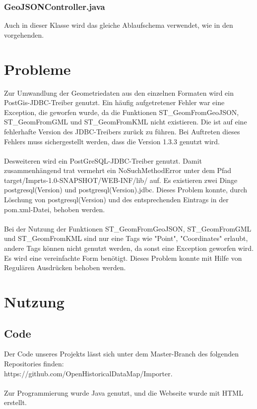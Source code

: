 \documentclass[]{article}
\begin{document}
\subsubsection{GeoJSONController.java}
Auch in dieser Klasse wird das gleiche Ablaufschema verwendet, wie in den vorgehenden.

\section{Probleme}
Zur Umwandlung der Geometriedaten aus den einzelnen Formaten wird ein PostGis-JDBC-Treiber genutzt. Ein häufig aufgetretener Fehler war eine Exception, die geworfen wurde, da die Funktionen ST\_GeomFromGeoJSON, \\ST\_GeomFromGML und ST\_GeomFromKML nicht existieren. Die ist auf eine fehlerhafte Version des JDBC-Treibers zurück zu führen. Bei Auftreten dieses Fehlers muss sichergestellt werden, dass die Version 1.3.3 genutzt wird.\\
\\

Desweiteren wird ein PostGreSQL-JDBC-Treiber genutzt. Damit zusammenhängend trat vermehrt ein NoSuchMethodError unter dem Pfad target/Imprts-1.0-SNAPSHOT/WEB-INF/lib/ auf. Es existieren zwei Dinge postgresql(Version) und postgresql(Version).jdbc. Dieses Problem konnte, durch Löschung von postgresql(Version) und des entsprechenden Eintrags in der pom.xml-Datei, behoben werden.\\
\\

Bei der Nutzung der Funktionen ST\_GeomFromGeoJSON, ST\_GeomFromGML und ST\_GeomFromKML sind nur eine Tags wie "Point", "Coordinates" erlaubt, andere Tags können nicht genutzt werden, da sonst eine Exception geworfen wird. Es wird eine vereinfachte Form benötigt. Dieses Problem konnte mit Hilfe von Regulären Ausdrücken behoben werden.

\section{Nutzung}
\subsection{Code}
Der Code unseres Projekts lässt sich unter dem Master-Branch des folgenden Repositories finden: \\https://github.com/OpenHistoricalDataMap/Importer. \\
\\
Zur Programmierung wurde Java genutzt, und die Webseite wurde mit HTML erstellt.
\end{document}
